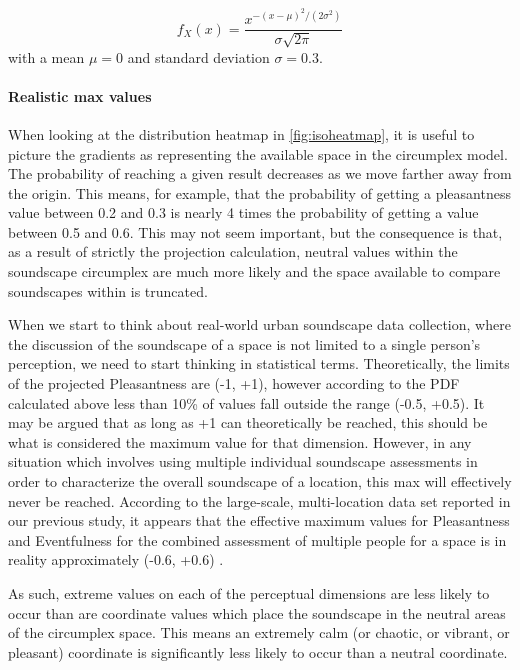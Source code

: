 \[   f_X(x) = \frac{x^{-(x-\mu)^2/(2\sigma^2)}}{\sigma \sqrt{2\pi}}\]
with a mean $\mu = 0$ and standard deviation $\sigma = 0.3$.

\paragraph*{Realistic max values}
When looking at the distribution heatmap in \cref{fig:isoheatmap}, it is useful to picture the gradients as representing the available space in the circumplex model. The probability of reaching a given result decreases as we move farther away from the origin. This means, for example, that the probability of getting a pleasantness value between 0.2 and 0.3 is nearly 4 times the probability of getting a value between 0.5 and 0.6. This may not seem important, but the consequence is that, as a result of strictly the projection calculation, neutral values within the soundscape circumplex are much more likely and the space available to compare soundscapes within is truncated.

When we start to think about real-world urban soundscape data collection, where the discussion of the soundscape of a space is not limited to a single person's perception, we need to start thinking in statistical terms. Theoretically, the limits of the projected Pleasantness are (-1, +1), however according to the PDF calculated above less than 10\% of values fall outside the range (-0.5, +0.5).
It may be argued that as long as +1 can theoretically be reached, this should be what is considered the maximum value for that dimension. However, in any situation which involves using multiple individual soundscape assessments in order to characterize the overall soundscape of a location, this max will effectively never be reached. According to the large-scale, multi-location data set reported in our previous study, it appears that the effective maximum values for Pleasantness and Eventfulness for the combined assessment of multiple people for a space is in reality approximately (-0.6, +0.6) \citep{Lionello2021Introducing}.

As such, extreme values on each of the perceptual dimensions are less likely to occur than are coordinate values which place the soundscape in the neutral areas of the circumplex space. This means an extremely calm (or chaotic, or vibrant, or pleasant) coordinate is significantly less likely to occur than a neutral coordinate.


